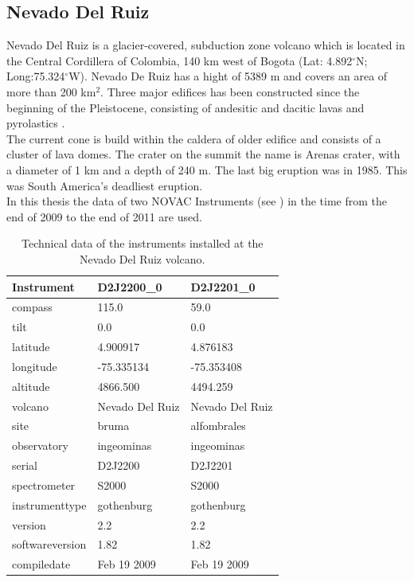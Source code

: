 \documentclass  [
  paper    = a4,
  BCOR     = 10mm,
  twoside,
  fontsize = 12pt,
  fleqn,
  toc      = bibnumbered,
  toc      = listofnumbered,
  numbers  = noendperiod,
  headings = normal,
  listof   = leveldown,
  version  = 3.03
]                                       {scrreprt}
\begin{document}
	\subsection*{Nevado Del Ruiz}
	Nevado Del Ruiz is a glacier-covered, subduction zone volcano which is located in the Central Cordillera of Colombia, 140 km west of Bogota
	(Lat: 4.892$^{\circ}$N; Long:75.324$^{\circ}$W). Nevado De Ruiz has a hight of 5389 m and covers an area of more than 200 km$^2$.
	Three major edifices has been constructed since the beginning of the Pleistocene, consisting of andesitic and dacitic lavas and pyrolastics \citep{GlobalVolcanismProgram}. \\
	The current cone is build within the caldera of older edifice and consists of a cluster of lava domes. The crater on the summit the name is Arenas crater, with a diameter of 1 km and a depth of 240 m. 
	The last big eruption was in 1985. This was South America's deadliest eruption.\\
	In this thesis the data of two NOVAC Instruments (see ) in the time from the end of 2009 to the end of 2011 are used. 
	\begin{table}[h]
		\centering
	\begin{tabular}{|p{4cm}|p{3cm}|p{3cm}|}
		Instrument	&D2J2200\_0&D2J2201\_0\\
		\toprule
		compass&115.0		&59.0		\\
		tilt&0.0		&0.0		\\
		latitude&4.900917		&4.876183		\\
		longitude&-75.335134		&-75.353408		\\
		altitude&4866.500		&4494.259		\\
		volcano&Nevado Del Ruiz		&Nevado Del Ruiz		\\
		site&bruma	&alfombrales\\
		observatory&ingeominas		&ingeominas		\\
		serial&D2J2200		&D2J2201		\\
		spectrometer&S2000		&S2000		\\	
		instrumenttype&gothenburg		&gothenburg		\\
		version&2.2		&2.2		\\
		softwareversion&1.82		&1.82		\\
		compiledate&Feb 19 2009		&Feb 19 2009		\\

		\bottomrule
	\end{tabular}
	\caption{Technical data of the instruments installed at the Nevado Del Ruiz volcano.}
	\label{tab:NVDRInstruments}
\end{table}
\end{document}
